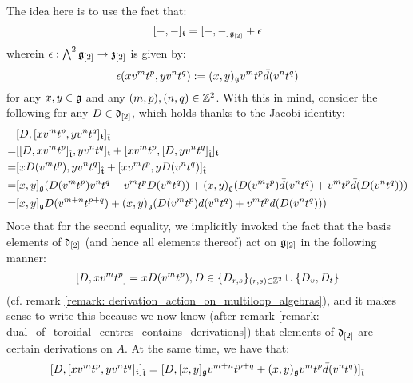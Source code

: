 \begin{remark}
\begin{enumerate}
                The idea here is to use the fact that:
                    $$[-, -]_{\toroidal} = [-, -]_{\g_{[2]}} + \e$$
                wherein $\e: \bigwedge^2 \g_{[2]} \to \z_{[2]}$ is given by:
                    $$\e(x v^m t^p, y v^n t^q) := (x, y)_{\g} v^m t^p \bar{d}(v^n t^q)$$
                for any $x, y \in \g$ and any $(m, p), (n, q) \in \Z^2$. With this in mind, consider the following for any $D \in \d_{[2]}$, which holds thanks to the Jacobi identity:
                    $$
                        \begin{aligned}
                            & [ D, [x v^m t^p, y v^n t^q]_{\toroidal} ]_{\extendedtoroidal}
                            \\
                            = & [ [D, x v^m t^p]_{\extendedtoroidal}, y v^n t^q ]_{\toroidal} + [ x v^m t^p, [D, y v^n t^q]_{\extendedtoroidal} ]_{\toroidal}
                            \\
                            = & [x D(v^m t^p), y v^n t^q]_{\extendedtoroidal} + [x v^m t^p, y D(v^n t^q)]_{\extendedtoroidal}
                            \\
                            = & [x, y]_{\g} (D(v^m t^p) v^n t^q + v^m t^p D(v^n t^q)) + (x, y)_{\g} ( D(v^m t^p) \bar{d}(v^n t^q) + v^m t^p \bar{d}(D(v^n t^q)) )
                            \\
                            = & [x, y]_{\g} D(v^{m + n} t^{p + q}) + (x, y)_{\g} ( D(v^m t^p) \bar{d}(v^n t^q) + v^m t^p \bar{d}(D(v^n t^q)) )
                        \end{aligned}
                    $$
                Note that for the second equality, we implicitly invoked the fact that the basis elements of $\d_{[2]}$ (and hence all elements thereof) act on $\g_{[2]}$ in the following manner:
                    $$[D, x v^m t^p] = x D(v^m t^p), D \in \{D_{r, s}\}_{(r, s) \in \Z^2} \cup \{D_v, D_t\}$$
                (cf. remark \ref{remark: derivation_action_on_multiloop_algebras}), and it makes sense to write this because we now know (after remark \ref{remark: dual_of_toroidal_centres_contains_derivations}) that elements of $\d_{[2]}$ are certain derivations on $A$. At the same time, we have that:
                    $$
                        \begin{aligned}
                            [ D, [x v^m t^p, y v^n t^q]_{\toroidal} ]_{\extendedtoroidal} & = [ D, [x, y]_{\g} v^{m + n} t^{p + q} + (x, y)_{\g} v^m t^p \bar{d}(v^n t^q) ]_{\extendedtoroidal}
                            \\

\end{aligned}$$
\end{enumerate}
\end{remark}
